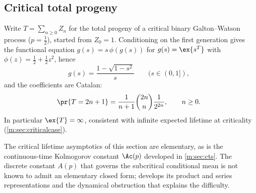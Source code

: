 \subsection{Critical total progeny}
\label{m:sec:total-progeny}

Write $T=\sum_{n\ge0}Z_n$ for the total progeny of a critical binary Galton--Watson
process ($p=\tfrac12$), started from $Z_0=1$. Conditioning on the first generation
gives the functional equation $g(s)=s\,\phi(g(s))$ for $g(s)=\ex{s^T}$ with
$\phi(z)=\tfrac12+\tfrac12 z^2$, hence
\begin{equation}
\label{m:eq:total-progeny-gf}
g(s) = \frac{1-\sqrt{1-s^2}}{s}\qquad(s\in(0,1]),
\end{equation}
and the coefficients are Catalan:
\begin{equation}
\label{m:eq:catalan}
\pr{T=2n+1} = \frac{1}{n+1}\binom{2n}{n}\frac{1}{2^{2n}},
\qquad n\ge0.
\end{equation}
In particular $\ex{T}=\infty$, consistent with infinite expected lifetime at
criticality (\cref{m:sec:criticalcase}).

\FloatBarrier

\begin{remark}
\label{m:rem:elem-vs-not}
The critical lifetime asymptotics of this section are elementary, as is the
continuous-time Kolmogorov constant $\Ac(p)$ developed in \cref{m:sec:cts}. The
discrete constant $A(p)$ that governs the subcritical conditional mean is not known
to admit an elementary closed form; \ChA develops its product and series
representations and the dynamical obstruction that explains the difficulty.
\end{remark}

